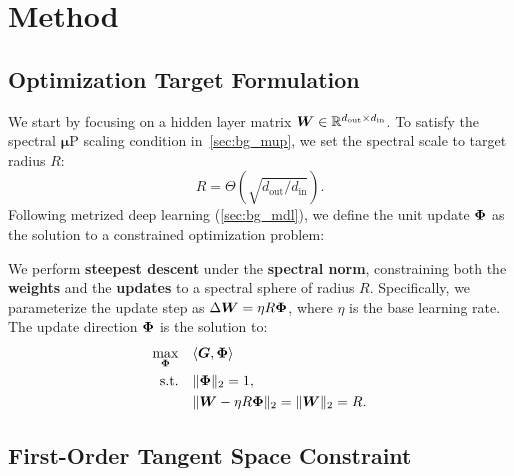 \section{Method}
\label{sec:methods}


\subsection{Optimization Target Formulation}
\label{sec:problem_formulation}

We start by focusing on a hidden layer matrix ${\bm{W}}\in\mathbb{R}^{d_{\text{out}}\times d_{\text{in}}}$. To satisfy the spectral $\boldsymbol{\mu}$P scaling condition in~\cref{sec:bg_mup}, we set the spectral scale to target radius $R$:
\begin{equation}
\label{eq:radius_def}
R = \Theta\left(\sqrt{d_{\text{out}}/d_{\text{in}}}\right).
\end{equation}
Following metrized deep learning (\cref{sec:bg_mdl}), we define the unit update ${\bm{\Phi}}$ as the solution to a constrained optimization problem:


\begin{mdframed}[style=MyBoxStyle2, frametitle={Formulation: Steepest Descent on the Spectral Sphere}, nobreak=true]

We perform \textbf{steepest descent} under the \textbf{spectral norm}, constraining both the \textbf{weights} and the \textbf{updates} to a spectral sphere of radius $R$. Specifically, we parameterize the update step as $\Delta {\bm{W}} = \eta R {\bm{\Phi}}$, where $\eta$ is the base learning rate. The update direction ${\bm{\Phi}}$ is the solution to:
\begin{equation}
\label{eq:opt_problem}
\begin{aligned}
\max_{{\bm{\Phi}}}\quad & \langle {\bm{G}}, {\bm{\Phi}} \rangle \\
\text{s.t.}\quad & \|{\bm{\Phi}}\|_2 = 1, \\
                 & \|{\bm{W}} - \eta R {\bm{\Phi}}\|_2 = \|{\bm{W}}\|_2 = R.
\end{aligned}
\end{equation}
\end{mdframed}

\subsection{First-Order Tangent Space Constraint}
\label{sec:tangent_linearization}

